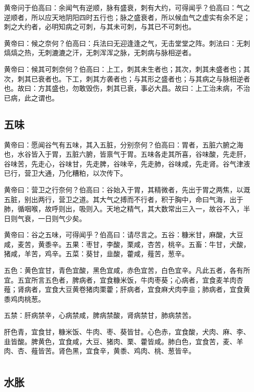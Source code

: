 \documentclass[12pt,UTF8]{ctexbook}
\begin{document}
	黄帝问于伯高曰：余闻气有逆顺，脉有盛衰，刺有大约，可得闻乎？伯高曰：气之逆顺者，所以应天地阴阳四时五行也；脉之盛衰者，所以候血气之虚实有余不足；刺之大约者，必明知病之可刺，与其未可刺，与其已不可刺也。
	
	黄帝曰：候之奈何？伯高曰：兵法曰无迎逢逢之气，无击堂堂之阵。刺法曰：无刺熇熇之热，无刺漉漉之汗，无刺浑浑之脉，无刺病与脉相逆者。
	
	黄帝曰：候其可刺奈何？伯高曰：上工，刺其未生者也；其次，刺其未盛者也；其次，刺其已衰者也。下工，刺其方袭者也；与其形之盛者也；与其病之与脉相逆者也。故曰：方其盛也，勿敢毁伤，刺其已衰，事必大昌。故曰：上工治未病，不治已病，此之谓也。
	\chapter{五味}
	
	黄帝曰：愿闻谷气有五味，其入五脏，分别奈何？伯高曰：胃者，五脏六腑之海也，水谷皆入于胃，五脏六腑，皆禀气于胃。五味各走其所喜，谷味酸，先走肝，谷味苦，先走心，谷味甘，先走脾，谷味辛，先走肺，谷味咸，先走肾。谷气津液已行，营卫大通，乃化糟粕，以次传下。
	
	黄帝曰：营卫之行奈何？伯高曰：谷始入于胃，其精微者，先出于胃之两焦，以溉五脏，别出两行，营卫之道。其大气之搏而不行者，积于胸中，命曰气海，出于肺，循咽喉，故呼则出，吸则入。天地之精气，其大数常出三入一，故谷不入，半日则气衰，一日则气少矣。
	
	黄帝曰：谷之五味，可得闻乎？伯高曰：请尽言之。五谷：糠米甘，麻酸，大豆咸，麦苦，黄黍辛。五果：枣甘，李酸，栗咸，杏苦，桃辛。五畜：牛甘，犬酸，猪咸，羊苦，鸡辛。五菜：葵甘，韭酸，藿咸，薤苦，葱辛。
	
	五色：黄色宜甘，青色宜酸，黑色宜咸，赤色宜苦，白色宜辛。凡此五者，各有所宜。五宜所言五色者，脾病者，宜食糠米饭，牛肉枣葵；心病者，宜食麦羊肉杏薤；肾病者，宜食大豆黄卷猪肉栗藿；肝病者，宜食麻犬肉李韭；肺病者，宜食黄黍鸡肉桃葱。
	
	五禁：肝病禁辛，心病禁咸，脾病禁酸，肾病禁甘，肺病禁苦。
	
	肝色青，宜食甘，糠米饭、牛肉、枣、葵皆甘。心色赤，宜食酸，犬肉、麻、李、韭皆酸。脾黄色，宜食咸，大豆、猪肉、栗、藿皆咸。肺白色，宜食苦，麦、羊肉、杏、薤皆苦。肾色黑，宜食辛，黄黍、鸡肉、桃、葱皆辛。
	
	\part{}
	\chapter{水胀}
	
\end{document}
